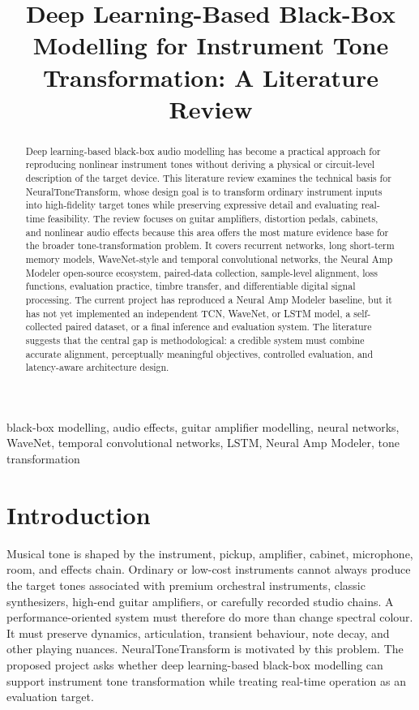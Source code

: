 \documentclass[conference]{IEEEtran}
\title{Deep Learning-Based Black-Box Modelling for Instrument Tone Transformation: A Literature Review}
\author{
\IEEEauthorblockN{YangJunyan 2330034063}
}
\begin{document}
\raggedbottom

\maketitle

\begin{abstract}
Deep learning-based black-box audio modelling has become a practical approach for reproducing nonlinear instrument tones without deriving a physical or circuit-level description of the target device. This literature review examines the technical basis for NeuralToneTransform, whose design goal is to transform ordinary instrument inputs into high-fidelity target tones while preserving expressive detail and evaluating real-time feasibility. The review focuses on guitar amplifiers, distortion pedals, cabinets, and nonlinear audio effects because this area offers the most mature evidence base for the broader tone-transformation problem. It covers recurrent networks, long short-term memory models, WaveNet-style and temporal convolutional networks, the Neural Amp Modeler open-source ecosystem, paired-data collection, sample-level alignment, loss functions, evaluation practice, timbre transfer, and differentiable digital signal processing. The current project has reproduced a Neural Amp Modeler baseline, but it has not yet implemented an independent TCN, WaveNet, or LSTM model, a self-collected paired dataset, or a final inference and evaluation system. The literature suggests that the central gap is methodological: a credible system must combine accurate alignment, perceptually meaningful objectives, controlled evaluation, and latency-aware architecture design.
\end{abstract}

\begin{IEEEkeywords}
black-box modelling, audio effects, guitar amplifier modelling, neural networks, WaveNet, temporal convolutional networks, LSTM, Neural Amp Modeler, tone transformation
\end{IEEEkeywords}

\section{Introduction}

Musical tone is shaped by the instrument, pickup, amplifier, cabinet, microphone, room, and effects chain. Ordinary or low-cost instruments cannot always produce the target tones associated with premium orchestral instruments, classic synthesizers, high-end guitar amplifiers, or carefully recorded studio chains. A performance-oriented system must therefore do more than change spectral colour. It must preserve dynamics, articulation, transient behaviour, note decay, and other playing nuances. NeuralToneTransform is motivated by this problem. The proposed project asks whether deep learning-based black-box modelling can support instrument tone transformation while treating real-time operation as an evaluation target.
\end{document}
